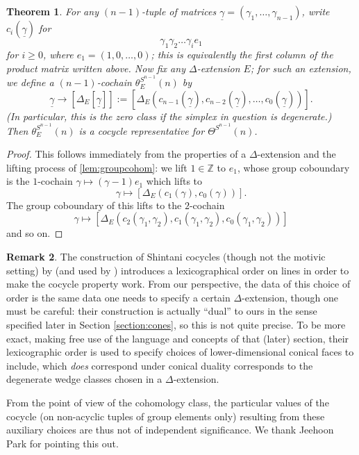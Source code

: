 \documentclass[10pt]{amsart}
\newtheorem{thm}{Theorem}[section]
\theoremstyle{definition}
\newtheorem{rem}[thm]{Remark}
\numberwithin{equation}{section}
\begin{document}
    \begin{thm} \label{thm:combrep}
        For any $(n-1)$-tuple of matrices $\underline{\gamma}=(\gamma_1,\ldots, \gamma_{n-1})$, write $c_i(\underline{\gamma})$ for 
        \[\gamma_1\gamma_{2}\ldots\gamma_i e_1\]
        for $i\ge 0$, where $e_1=(1,0,\ldots, 0)$; this is equivalently the first column of the product matrix written above. Now fix any $\Delta$-extension $E$; for such an extension, we define a $(n-1)$-cochain $\theta_E^{S^{n-1}}(n)$ by
        \begin{equation} \label{eq:thetacom}
         \underline{\gamma}\to [\Delta_E[\underline{\gamma}]]:=  [\Delta_E(c_{n-1}(\underline{\gamma}),c_{n-2}(\underline{\gamma}),\ldots, c_0(\underline{\gamma}))].
        \end{equation}
        (In particular, this is the zero class if the simplex in question is degenerate.) Then $\theta^{S^{n-1}}_E(n)$ is a cocycle representative for $\Theta^{S^{n-1}}(n)$.
    \end{thm}
    \begin{proof}
        This follows immediately from the properties of a $\Delta$-extension and the lifting process of \ref{lem:groupcohom}: we lift $1\in \mathbb{Z}$ to $e_1$, whose group coboundary is the $1$-cochain $\gamma \mapsto (\gamma-1)e_1$ which lifts to
        \[
        \gamma\mapsto [\Delta_E(c_1(\gamma),c_0(\gamma))].
        \]
        The group coboundary of this lifts to the $2$-cochain
        \[
        \gamma\mapsto [\Delta_E(c_2(\gamma_1,\gamma_2),c_1(\gamma_1,\gamma_2),c_0(\gamma_1,\gamma_2))]
        \]
        and so on.
    \end{proof}

    \begin{rem}
        The construction of Shintani cocycles (though not the motivic setting) by \cite{Hill} (and used by \cite{LP}) introduces a lexicographical order on lines in order to make the cocycle property work. From our perspective, the data of this choice of order is the same data one needs to specify a certain $\Delta$-extension, though one must be careful: their construction is actually ``dual'' to ours in the sense specified later in Section \ref{section:cones}, so this is not quite precise. To be more exact, making free use of the language and concepts of that (later) section, their lexicographic order is used to specify choices of lower-dimensional conical faces to include, which \emph{does} correspond under conical duality corresponds to the degenerate wedge classes chosen in a $\Delta$-extension.
        
        From the point of view of the cohomology class, the particular values of the cocycle (on non-acyclic tuples of group elements only) resulting from these auxiliary choices are thus not of independent significance. We thank Jeehoon Park for pointing this out. 
    \end{rem}
\end{document}
